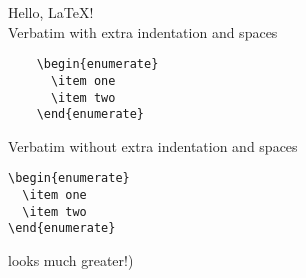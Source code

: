 \documentclass[12pt,a4paper,oneside]{article}
\begin{document}
  Hello, \LaTeX! \\ Verbatim with extra indentation and spaces
  \begin{verbatim}
    \begin{enumerate}
      \item one
      \item two
    \end{enumerate}
  \end{verbatim}
  Verbatim without extra indentation and spaces
\begin{verbatim}
\begin{enumerate}
  \item one
  \item two
\end{enumerate}
\end{verbatim}
  looks much greater!)
\end{document}
